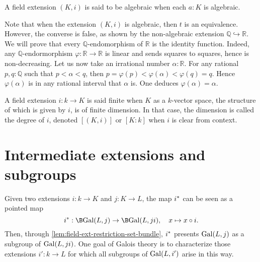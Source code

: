 \begin{definition}
  A field extension $(K,i)$ is said to be algebraic when each $a:K$ is algebraic.
  \label{defn:algebraic-extension}
\end{definition}

\begin{remark}
  Note that when the extension $(K,i)$ is algebraic, then $t$ is an
  equivalence. However, the converse is false, as shown by the non-algebraic
  extension $\mathbb Q \hookrightarrow \mathbb R$. We will prove that every
  $\mathbb Q$-endomorphism of $\mathbb R$ is the identity function. Indeed, any
  $\mathbb Q$-endormorphism $\varphi : \mathbb R \to \mathbb R$ is linear and
  sends squares to squares, hence is non-decreasing. Let us now take an irrational
  number $\alpha:\mathbb R$. For any rational $p,q:\mathbb Q$ such that $p <
  \alpha < q$, then $p = \varphi(p) < \varphi(\alpha) < \varphi(q) = q$. Hence
  $\varphi(\alpha)$ is in any rational interval that $\alpha$ is. One deduces
  $\varphi(\alpha) = \alpha$.
  \label{rem:algebraic-endomorphisms-are-automorphisms}
\end{remark}

\begin{definition}
  A field extension $i:k\to K$ is said finite when $K$ as a
  $k$-vector space, the structure of which is given by $i$, is of finite dimension.
  In that case, the dimension is called the degree of $i$, denoted $[(K,i)]$ or $[K:k]$ when $i$ is clear from context.
  \label{defn:degree-field-extension}
\end{definition} 

\section{Intermediate extensions and subgroups}
%
Given two extensions $i: k \to K$ and $j: K \to L$, the map ${{i}^\ast}$ can be seen as a pointed map
\begin{displaymath}
  \restr i: \B\Gal(L,j) \to \B\Gal(L,ji),\quad x\mapsto x\circ i.
\end{displaymath}
Then, through \cref{lem:field-ext-restriction-set-bundle}, ${{i}^\ast}$ presents
$\mathrm{Gal}(L,j)$ as a subgroup of $\mathrm{Gal}(L,ji)$. One goal of Galois theory is to
characterize those extensions $i':k \to L$ for which all subgroups of
$\mathrm{Gal}(L,i')$ arise in this way. 

